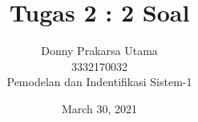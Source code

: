\documentclass[10pt]{article}
\begin{document}
\title{Tugas 2 : 2 Soal }
\author{Donny Prakarsa Utama\\3332170032\\Pemodelan dan Indentifikasi Sistem-1}
\date{March 30, 2021}
\maketitle
\end{document}
